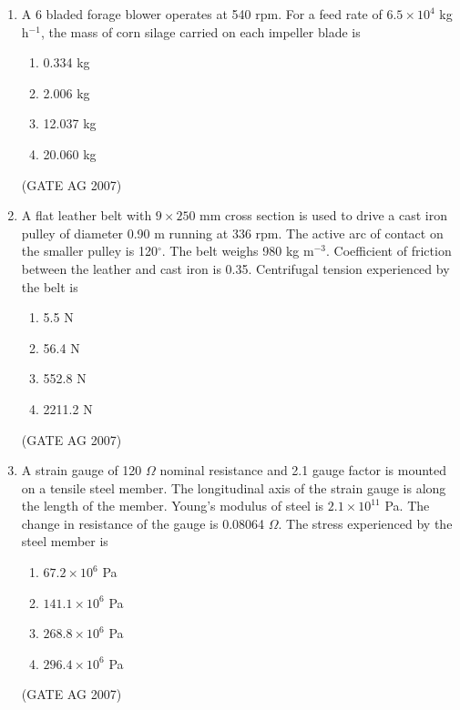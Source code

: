 \documentclass[journal,12pt,onecolumn]{IEEEtran}
\theoremstyle{remark}
\begin{document}
\begin{enumerate}
\item A 6 bladed forage blower operates at 540 rpm. For a feed rate of $6.5\times 10^{4}$ kg h$^{-1}$, the mass of corn silage carried on each impeller blade is  
\begin{multicols}{4}
\begin{enumerate}
    \item 0.334 kg
    \item 2.006 kg
    \item 12.037 kg
    \item 20.060 kg
\end{enumerate}
\end{multicols}
\hfill(GATE AG 2007)

\item A flat leather belt with $9\times 250$ mm cross section is used to drive a cast iron pulley of diameter 0.90 m running at 336 rpm. The active arc of contact on the smaller pulley is 120$^\circ$. The belt weighs 980 kg m$^{-3}$. Coefficient of friction between the leather and cast iron is 0.35. Centrifugal tension experienced by the belt is  
\begin{multicols}{4}
\begin{enumerate}
    \item 5.5 N
    \item 56.4 N
    \item 552.8 N
    \item 2211.2 N
\end{enumerate}
\end{multicols}
\hfill(GATE AG 2007)

\item A strain gauge of 120 $\Omega$ nominal resistance and 2.1 gauge factor is mounted on a tensile steel member. The longitudinal axis of the strain gauge is along the length of the member. Young's modulus of steel is $2.1\times 10^{11}$ Pa. The change in resistance of the gauge is 0.08064 $\Omega$. The stress experienced by the steel member is  

\begin{multicols}{4}
\begin{enumerate}
    \item $67.2\times 10^{6}$ Pa
    \item $141.1\times 10^{6}$ Pa
    \item $268.8\times 10^{6}$ Pa
    \item $296.4\times 10^{6}$ Pa
\end{enumerate}
\end{multicols}
\hfill(GATE AG 2007)


\end{enumerate}
\end{document}
